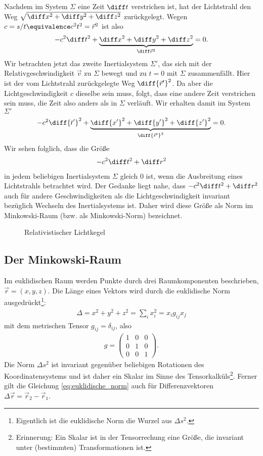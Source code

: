 Nachdem im System $\Sigma$ eine Zeit $\diff t$ verstrichen ist, hat der Lichtstrahl den Weg $\sqrt{\diff x^2+\diff y^2+\diff z^2}$ zurückgelegt.
Wegen $c=s/t\equivalence c^2 t^2 = \vec r^2$ ist also
\begin{align*}
    -c^2 \diff t^2+\underbrace{\diff x^2+\diff y^2+\diff z^2}_{\diff\vec r^2}=0.
\end{align*}
Wir betrachten jetzt das zweite Inertialsystem $\Sigma'$, das sich mit der Relativgeschwindigkeit $\vec v$ zu $\Sigma$ bewegt und zu $t=0$ mit $\Sigma$ zusammenfällt.
Hier ist der vom Lichtstrahl zurückgelegte Weg $\diff{\vec r'}^2$.
Da aber die Lichtgeschwindigkeit $c$ dieselbe sein muss, folgt, dass eine andere Zeit verstrichen sein muss, die Zeit also anders als in $\Sigma$ verläuft.
Wir erhalten damit im System $\Sigma'$
\begin{align*}
    -c^2 \diff{t'}^2+\underbrace{\diff{x'}^2+\diff{y'}^2+\diff{z'}^2}_{\diff{\vec r'}^2}=0.
\end{align*}
Wir sehen folglich, dass die Größe
\begin{align*}
    -c^2\diff t^2+\diff r^2
\end{align*}
in jedem beliebigen Inertialsystem $\Sigma$ gleich $0$ ist, wenn die Ausbreitung eines Lichtstrahls betrachtet wird.
Der Gedanke liegt nahe, dass $-c^2\diff t^2+\diff r^2$ auch für andere Geschwindigkeiten als die Lichtgeschwindigkeit invariant bezüglich Wechseln des Inertialsystems ist.
Daher wird diese Größe als Norm im Minkowski-Raum (bzw. als Minkowski-Norm) bezeichnet.


\begin{figure}[htb]
    \centering
    \tfigLightCone
    \caption{Relativistischer Lichtkegel}
    \label{fig:srt_lichtkegel}
\end{figure}


\subsection{Der Minkowski-Raum}

Im euklidischen Raum werden Punkte durch drei Raumkomponenten beschrieben, $\vec r=(x,y,z)$.
Die Länge eines Vektors wird durch die euklidische Norm ausgedrückt\footnote{Eigentlich ist die euklidische Norm die Wurzel aus $\Delta s^2$.}:
\begin{align}
    \label{eq:euklidische_norm}
    \Delta=x^2+y^2+z^2=\sum_i x_i^2=x_ig_{ij}x_j
\end{align}
mit dem metrischen Tensor $g_{ij}=\delta_{ij}$, also
\begin{align*}
    g = \begin{pmatrix}
            1 & 0 & 0 \\
            0 & 1 & 0 \\
            0 & 0 & 1
        \end{pmatrix}.
\end{align*}
Die Norm $\Delta s^2$ ist invariant gegenüber beliebigen Rotationen des Koordinatensystems und ist daher ein Skalar im Sinne des Tensorkalküls\footnote{Erinnerung: Ein Skalar ist in der Tensorrechung eine Größe, die invariant unter (bestimmten) Transformationen ist. }.
Ferner gilt die Gleichung \eqref{eq:euklidische_norm} auch für Differenzvektoren $\Delta\vec r=\vec r_2-\vec r_1$.

